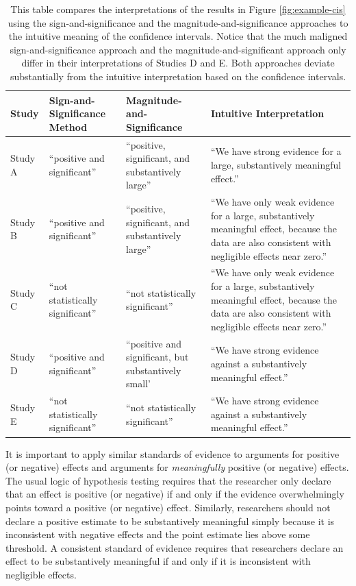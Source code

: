 \documentclass[12pt]{article}
\begin{document}
\singlespace
\renewcommand{\arraystretch}{1.5}
\begin{table}[H]
\begin{center}
\begin{scriptsize}
\begin{tabular}{|>{\centering\arraybackslash}m{.5in}>{\centering\arraybackslash}m{1.75in}>{\centering\arraybackslash}m{1.75in}>{\centering\arraybackslash}
m{1.75in}|}
\hline
Study & Sign-and-Significance Method & Magnitude-and-Significance & Intuitive Interpretation\\ 
\hline
Study A & ``positive and significant'' & ``positive, significant, and substantively large'' & ``We have strong evidence for a large, substantively meaningful effect.''\\
Study B & ``positive and significant'' & ``positive, significant, and substantively large'' & ``We have only weak evidence for a large, substantively meaningful effect, because the data are also consistent with negligible effects near zero.''\\
Study C & ``not statistically significant'' & ``not statistically significant'' & ``We have only weak evidence for a large, substantively meaningful effect, because the data are also consistent with negligible effects near zero.''\\
Study D & ``positive and significant'' & ``positive and significant, but substantively small' & ``We have strong evidence against a substantively meaningful effect.''\\
Study E & ``not statistically significant'' & ``not statistically significant'' & ``We have strong evidence against a substantively meaningful effect.''\\
\hline
\end{tabular}\caption{This table compares the interpretations of the results in Figure \ref{fig:example-cis} using the sign-and-significance and the magnitude-and-significance approaches to the intuitive meaning of the confidence intervals. Notice that the much maligned sign-and-significance approach and the magnitude-and-significant approach only differ in their interpretations of Studies D and E. Both approaches deviate substantially from the intuitive interpretation based on the confidence intervals.}\label{tab:example-cis}
\end{scriptsize}
\end{center}
\end{table}
\doublespace

It is important to apply similar standards of evidence to arguments for positive (or negative) effects and arguments for \emph{meaningfully} positive (or negative) effects. The usual logic of hypothesis testing requires that the researcher only declare that an effect is positive (or negative) if and only if the evidence overwhelmingly points toward a positive (or negative) effect. Similarly, researchers should not declare a positive estimate to be substantively meaningful simply because it is inconsistent with negative effects and the point estimate lies above some threshold. A consistent standard of evidence requires that researchers declare an effect to be substantively meaningful if and only if it is inconsistent with negligible effects.
\end{document}
